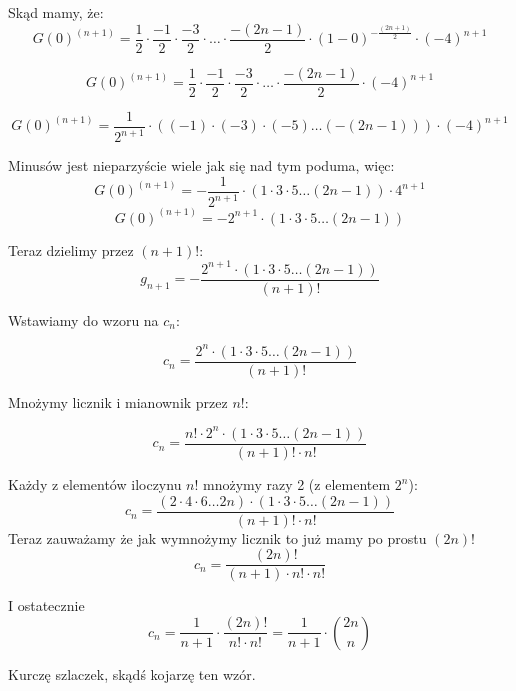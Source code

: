 Skąd mamy, że:
\begin{equation*}
	G(0)^{(n+1)} = \frac{1}{2} \cdot \frac{-1}{2} \cdot \frac{-3}{2} \cdot \dots \cdot \frac{-(2n - 1)}{2} \cdot (1-0)^{- \frac{(2n+1)}{2}} \cdot (-4)^{n+1}
\end{equation*}

\begin{equation*}
	G(0)^{(n+1)} = \frac{1}{2} \cdot \frac{-1}{2} \cdot \frac{-3}{2} \cdot \dots \cdot \frac{-(2n - 1)}{2} \cdot (-4)^{n+1}
\end{equation*}

\begin{equation*}
	G(0)^{(n+1)} = \frac{1}{2^{n+1}} \cdot ( (-1) \cdot (-3) \cdot (-5) \dots (-(2n - 1))) \cdot (-4)^{n+1}
\end{equation*}

Minusów jest nieparzyście wiele jak się nad tym poduma, więc:
\begin{equation*}
	G(0)^{(n+1)} = -\frac{1}{2^{n+1}} \cdot ( 1 \cdot 3 \cdot 5 \dots (2n - 1)) \cdot 4^{n+1}
\end{equation*}
\begin{equation*}
	G(0)^{(n+1)} = - 2^{n+1}  \cdot ( 1 \cdot 3 \cdot 5 \dots (2n - 1))
\end{equation*}

Teraz dzielimy przez $(n+1)!$:
\begin{equation*}
	g_{n+1} = - \frac{  2^{n+1}  \cdot ( 1 \cdot 3 \cdot 5 \dots (2n - 1)) }{(n+1)!}
\end{equation*}

Wstawiamy do wzoru na $c_n$:

\begin{equation*}
	c_{n} = \frac{  2^n  \cdot ( 1 \cdot 3 \cdot 5 \dots (2n - 1)) }{(n+1)!}
\end{equation*}

Mnożymy licznik i mianownik przez $n!$:

\begin{equation*}
	c_{n} = \frac{  n! \cdot 2^n  \cdot ( 1 \cdot 3 \cdot 5 \dots (2n - 1)) }{(n+1)! \cdot n!}
\end{equation*}

Każdy z elementów iloczynu $n!$ mnożymy razy 2 (z elementem $2^n$):
\begin{equation*}
	c_{n} = \frac{  (2 \cdot 4 \cdot 6 \dots 2n)  \cdot ( 1 \cdot 3 \cdot 5 \dots (2n - 1)) }{(n+1)! \cdot n!}
\end{equation*}
Teraz zauważamy że jak wymnożymy licznik to już mamy po prostu $(2n)!$
\begin{equation*}
	c_{n} = \frac{(2n)!}{(n+1) \cdot n! \cdot n!}
\end{equation*}

I ostatecznie
\begin{equation*}
	c_{n} = \frac{1}{n+1} \cdot \frac{(2n)!}{n! \cdot n!} = \frac{1}{n+1} \cdot \binom{2n}{n}
\end{equation*}

Kurczę szlaczek, skądś kojarzę ten wzór.